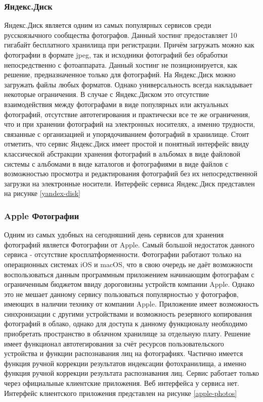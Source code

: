 \subsubsection{Яндекс.Диск}
Яндекс.Диск является одним из самых популярных сервисов среди русскоязычного сообщества фотографов. 
Данный хостинг предоставляет 10 гигабайт бесплатного хранилища при регистрации. 
Причём загружать можно как фотографии в формате jpeg, так и исходники фотографий без обработки непосредственно с фотоаппарата. 
Данный хостинг не позиционируется, как решение, предназначенное только для фотографий. 
На Яндекс.Диск можно загружать файлы любых форматов. 
Однако универсальность всегда накладывает некоторые ограничения. 
В случае с Яндекс.Диском это отсутствие взаимодействия между фотографами в виде популярных или актуальных фотографий, отсутствие автотегирования и практически все те же ограничения, что и при хранении фотографий на электронных носителях, а именно трудности, связанные с организацией и упорядочиванием фотографий в хранилище. 
Стоит отметить, что сервис Яндекс.Диск имеет простой и понятный интерфейс ввиду классической абстракции хранения фотографий в альбомах в виде файловой системы с альбомами в виде каталогов и фотографиями в виде файлов с возможностью просмотра и редактирования фотографий без их непосредственной загрузки на электронные носители. Интерфейс сервиса Яндекс.Диск представлен на рисунке \ref{yandex-disk}

\subsubsection{Apple Фотографии}
Одним из самых удобных на сегодняшний день сервисов для хранения фотографий является Фотографии от Apple.
Самый большой недостаток данного сервиса - отсутствие кросплатформенности. 
Фотографии работают только на операционных системах iOS и macOS, что в свою очередь не даёт возможности воспользоваться данным программным приложением начинающим фотографам с ограниченным бюджетом ввиду дороговизны устройств компании Apple.
Однако это не мешает данному сервису пользоваться популярностью у фотографов, имеющих в наличии технику от компании Apple. 
Приложение имеет возможность синхронизации с другими устройствами и возможность резервного копирования фотографий в облако, однако для доступа к данному функционалу необходимо приобретать пространство в облачном хранилище за отдельную плату.
Решение имеет функционал автотегирования за счёт ресурсов пользовательского устройства и функции распознавания лиц на фотографиях.
Частично имеется функция ручной коррекции результатов индексации фотохранилища, а именно функция ручной коррекции результата распознавания лиц.
Сервис работает только через официальные клиентские приложения.
Веб интерфейса у сервиса нет.
Интерфейс клиентского приложения представлен на рисунке \ref{apple-photos}

